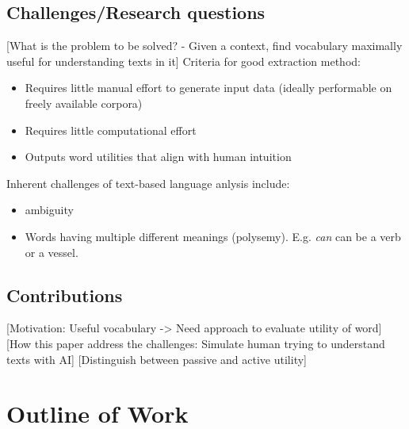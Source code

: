 \subsection{Challenges/Research questions}
[What is the problem to be solved? - Given a context, find vocabulary maximally useful for understanding texts in it]
Criteria for good extraction method:
\begin{itemize}
	\item Requires little manual effort to generate input data (ideally performable on freely available corpora)
	\item Requires little computational effort
	\item Outputs word utilities that align with human intuition 
\end{itemize}

Inherent challenges of text-based language anlysis include:
\begin{itemize}
	\item ambiguity
	\item Words having multiple different meanings (polysemy). E.g. \textit{can} can be a verb or a vessel.
\end{itemize}

\subsection{Contributions}
[Motivation: Useful vocabulary -> Need approach to evaluate utility of word]
[How this paper address the challenges: Simulate human trying to understand texts with AI]
[Distinguish between passive and active utility]

\section{Outline of Work}

